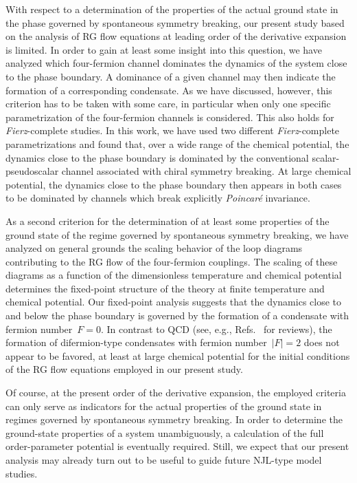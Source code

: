 \documentclass[prd,english,preprintnumbers,amsmath,amssymb,nofootinbib,twocolumn,superscriptaddress]{revtex4-1}
\begin{document}
{{With respect to a determination of the properties of the actual {ground 
state in the phase governed by spontaneous symmetry breaking}, 
our present study based on the analysis of RG flow equations at leading order of the derivative expansion is limited. In order
to gain at least some insight into this question, we have analyzed which four-fermion channel dominates the dynamics of the system 
close to the phase boundary. A dominance of a given channel may then indicate the formation of 
a corresponding condensate. As we have discussed, 
however, this criterion has to be taken with some care, in particular when only one specific parametrization of the four-fermion
channels is considered. This also holds for {\it Fierz}-complete studies. In this work, we have used two different 
{\it Fierz}-complete parametrizations
and found that, over a wide range of the chemical potential, the dynamics close to the phase boundary is dominated 
by {the conventional scalar-pseudoscalar channel associated with 
chiral symmetry breaking. At large chemical potential, the dynamics
close to the phase boundary then appears in both cases to be dominated by channels which break explicitly {\it Poincar\'{e}} invariance.}

As a second criterion for the determination of at least some properties of the ground state of the regime governed by
spontaneous symmetry breaking, we have analyzed on general grounds the scaling behavior of the loop diagrams contributing
to the RG flow of the four-fermion couplings. The scaling of these diagrams as a function of the dimensionless temperature and
chemical potential determines the fixed-point structure of the theory at finite temperature and chemical potential. Our
fixed-point analysis suggests {that the dynamics close} to and below the phase boundary
is governed by the formation of a condensate with fermion number~$F=0$. In 
contrast to QCD (see, e.g., Refs.~\cite{Bailin:1983bm,Buballa:2003qv,Alford:2007xm,Anglani:2013gfu} for reviews), 
the formation of difermion-type condensates with fermion number~$|F|=2$ does not appear to {be 
favored, at} least at large chemical potential 
for the initial conditions of the RG flow equations employed in our present study.

Of course, at the present order of the derivative expansion, 
the employed criteria can only serve as indicators for the actual properties of the ground state in regimes 
governed by spontaneous symmetry breaking. In order to determine
the ground-state properties of a system unambiguously, a calculation of the full order-parameter potential is eventually required. Still,
we expect that our present analysis may already turn out to be useful to guide future NJL-type model studies.

}}
\end{document}

